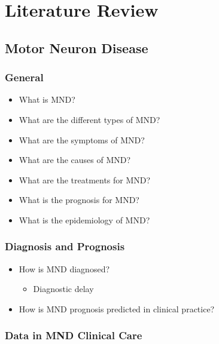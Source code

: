 \chapter{Literature Review}
\label{literature_review}

\section{Motor Neuron Disease}

\subsection{General}



\begin{itemize}
    \item What is MND?
    \item What are the different types of MND?
    \item What are the symptoms of MND?
    \item What are the causes of MND?
    \item What are the treatments for MND?
    \item What is the prognosis for MND?
    \item What is the epidemiology of MND?
\end{itemize}

\subsection{Diagnosis and Prognosis}

\begin{itemize}
    \item How is MND diagnosed?
    \begin{itemize}
        \item Diagnostic delay
    \end{itemize}
    \item How is MND prognosis predicted in clinical practice?
\end{itemize}

\subsection{Data in MND Clinical Care}

